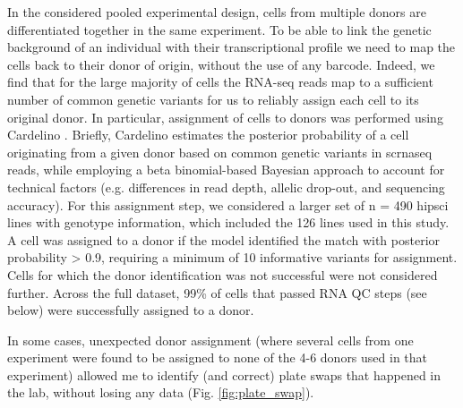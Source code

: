 In the considered pooled experimental design, cells from multiple donors are differentiated together in the same experiment. 
To be able to link the genetic background of an individual with their transcriptional profile we need to map the cells back to their donor of origin, without the use of any barcode.
Indeed, we find that for the large majority of cells the RNA-seq reads map to a sufficient number of common genetic variants for us to reliably assign each cell to its original donor.
In particular, assignment of cells to donors was performed using Cardelino \cite{mccarthy2020cardelino}. 
Briefly, Cardelino estimates the posterior probability of a cell originating from a given donor based on common genetic variants in \gls{scrnaseq} reads, while employing a beta binomial-based Bayesian approach to account for technical factors (e.g. differences in read depth, allelic drop-out, and sequencing accuracy). 
For this assignment step, we considered a larger set of n = 490 \gls{hipsci} lines with genotype information, which included the 126 lines used in this study. 
A cell was assigned to a donor if the model identified the match with posterior probability > 0.9, requiring a minimum of 10 informative variants for assignment. 
Cells for which the donor identification was not successful were not considered further.
Across the full dataset, 99\% of cells that passed RNA QC steps (see below) were successfully assigned to a donor.

In some cases, unexpected donor assignment (where several cells from one experiment were found to be assigned to none of the 4-6 donors used in that experiment) allowed me to identify (and correct) plate swaps that happened in the lab, without losing any data (Fig. \ref{fig:plate_swap}).

